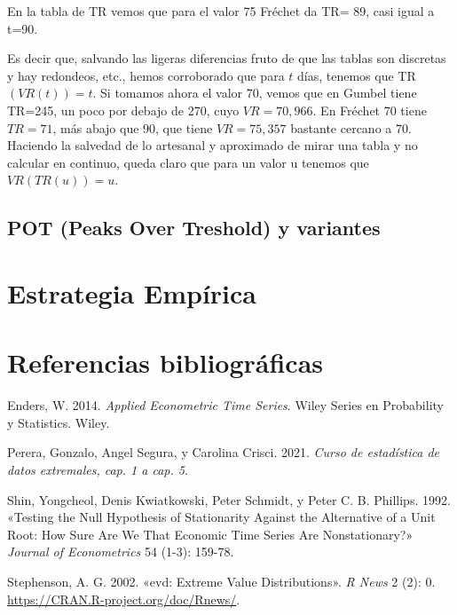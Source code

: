 \documentclass[
  oneside]{article}
\newlength{\cslhangindent}
\newlength{\cslentryspacingunit} %
\newenvironment{CSLReferences}[2] %
 {%
  \setlength{\parindent}{0pt}
  \ifodd #1
  \let\oldpar\par
  \def\par{\hangindent=\cslhangindent\oldpar}
  \fi
  \setlength{\parskip}{#2\cslentryspacingunit}
 }%
 {}
\begin{document}
En la tabla de TR vemos que para el valor 75 Fréchet da TR= 89, casi
igual a t=90.

Es decir que, salvando las ligeras diferencias fruto de que las tablas
son discretas y hay redondeos, etc., hemos corroborado que para \(t\)
días, tenemos que TR \((VR(t))=t\). Si tomamos ahora el valor 70, vemos
que en Gumbel tiene TR=245, un poco por debajo de 270, cuyo
\(VR=70,966\). En Fréchet 70 tiene \(TR=71\), más abajo que 90, que
tiene \(VR= 75,357\) bastante cercano a 70. Haciendo la salvedad de lo
artesanal y aproximado de mirar una tabla y no calcular en continuo,
queda claro que para un valor u tenemos que \(VR(TR(u))=u\).

\newpage

\subsection{POT (Peaks Over Treshold) y variantes}

\newpage

\section{Estrategia Empírica}

\newpage

\section{Referencias bibliográficas}

\hypertarget{refs}{}
\begin{CSLReferences}{1}{0}
\leavevmode{}%
Enders, W. 2014. \emph{Applied Econometric Time Series}. Wiley Series en
Probability y Statistics. Wiley.

\leavevmode{}%
Perera, Gonzalo, Angel Segura, y Carolina Crisci. 2021. \emph{Curso de
estadística de datos extremales, cap. 1 a cap. 5}.

\leavevmode{}%
Shin, Yongcheol, Denis Kwiatkowski, Peter Schmidt, y Peter C. B.
Phillips. 1992. {«Testing the Null Hypothesis of Stationarity Against
the Alternative of a Unit Root: How Sure Are We That Economic Time
Series Are Nonstationary?»} \emph{Journal of Econometrics} 54 (1-3):
159-78.

\leavevmode{}%
Stephenson, A. G. 2002. {«evd: Extreme Value Distributions»}. \emph{R
News} 2 (2): 0. \url{https://CRAN.R-project.org/doc/Rnews/}.

\end{CSLReferences}
\end{document}
